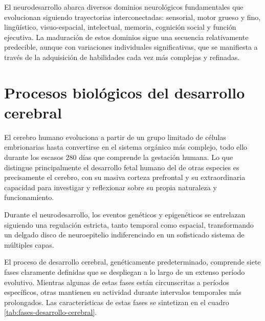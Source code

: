 \documentclass[11pt,letterpaper]{report}
\begin{document}
El neurodesarrollo abarca diversos dominios neurológicos fundamentales que 
evolucionan siguiendo trayectorias interconectadas: sensorial, motor grueso y
fino, lingüístico, visuo-espacial, intelectual, memoria, cognición social y
función ejecutiva. La maduración de estos dominios sigue una secuencia
relativamente predecible, aunque con  variaciones individuales significativas,
que se manifiesta a través de la  adquisición de habilidades cada vez más
complejas y refinadas. \cite{Nelson49}

\section{Procesos biológicos del desarrollo cerebral}
El cerebro humano evoluciona a partir de un grupo limitado de células
embrionarias hasta convertirse en el sistema orgánico más complejo, todo ello
durante los escasos 280 días que comprende la gestación humana. Lo que 
distingue principalmente el desarrollo fetal humano del de otras especies es 
precisamente el cerebro, con su masiva corteza prefrontal y su extraordinaria 
capacidad para investigar y reflexionar sobre su propia naturaleza y 
funcionamiento. \cite{Polin124}

Durante el neurodesarrollo, los eventos genéticos y epigenéticos se entrelazan 
siguiendo una regulación estricta, tanto temporal como espacial, transformando
un delgado disco de neuroepitelio indiferenciado en un sofisticado sistema de
múltiples capas. \cite{Polin124}

El proceso de desarrollo cerebral, genéticamente predeterminado, comprende
siete fases claramente definidas que se despliegan a lo largo de un extenso
período evolutivo. \cite{Kolb7} Mientras algunas de estas fases están
circunscritas a períodos específicos, otras mantienen su actividad durante
intervalos temporales más prolongados. Las características de estas fases se
sintetizan en el cuadro \ref{tab:fases-desarrollo-cerebral}.
\end{document}
